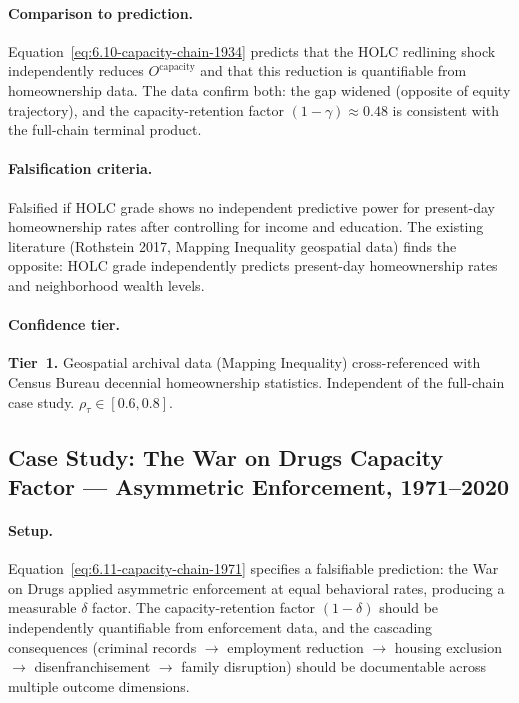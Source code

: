 \paragraph{Comparison to prediction.}
Equation~\ref{eq:6.10-capacity-chain-1934} predicts that the HOLC redlining shock independently reduces $O^{\text{capacity}}$ and that this reduction is quantifiable from homeownership data. The data confirm both: the gap widened (opposite of equity trajectory), and the capacity-retention factor $(1-\gamma) \approx 0.48$ is consistent with the full-chain terminal product.

\paragraph{Falsification criteria.}
Falsified if HOLC grade shows no independent predictive power for present-day homeownership rates after controlling for income and education. The existing literature (Rothstein 2017, Mapping Inequality geospatial data) finds the opposite: HOLC grade independently predicts present-day homeownership rates and neighborhood wealth levels.

\paragraph{Confidence tier.}
\textbf{Tier~1.} Geospatial archival data (Mapping Inequality) cross-referenced with Census Bureau decennial homeownership statistics. Independent of the full-chain case study. $\rho_\tau \in [0.6, 0.8]$.

\subsection*{Case Study: The War on Drugs Capacity Factor --- Asymmetric Enforcement, 1971--2020}
\label{cs:war_on_drugs_capacity}

\paragraph{Setup.}
Equation~\ref{eq:6.11-capacity-chain-1971} specifies a falsifiable prediction: the War on Drugs applied asymmetric enforcement at equal behavioral rates, producing a measurable $\delta$ factor. The capacity-retention factor $(1-\delta)$ should be independently quantifiable from enforcement data, and the cascading consequences (criminal records $\to$ employment reduction $\to$ housing exclusion $\to$ disenfranchisement $\to$ family disruption) should be documentable across multiple outcome dimensions.

